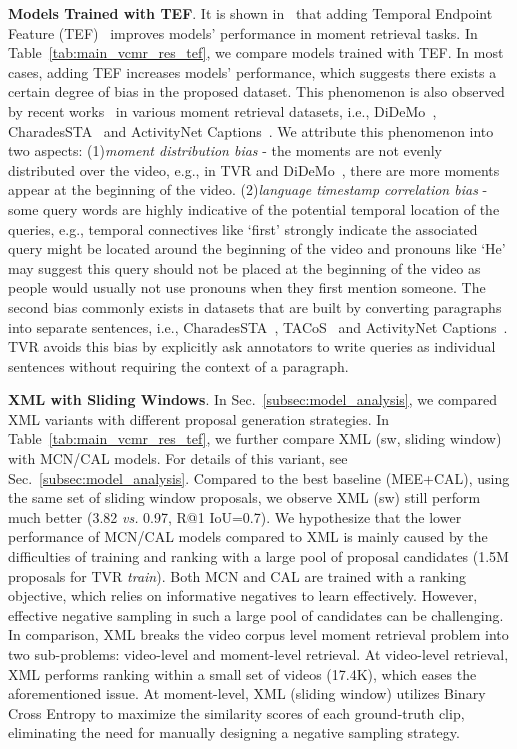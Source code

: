 \documentclass[runningheads]{llncs}
\begin{document}
\kern2mm
\noindent\textbf{Models Trained with TEF}. It is shown in~\cite{anne2017localizing,escorcia2019temporal} that adding Temporal Endpoint Feature (TEF)~\cite{anne2017localizing} improves models' performance in moment retrieval tasks. In Table~\ref{tab:main_vcmr_res_tef}, we compare models trained with TEF. 
In most cases, adding TEF increases models' performance, which suggests there exists a certain degree of bias in the proposed dataset. 
This phenomenon is also observed by recent works~\cite{anne2017localizing,escorcia2019temporal} in various moment retrieval datasets, i.e., DiDeMo~\cite{anne2017localizing}, CharadesSTA~\cite{gao2017tall} and ActivityNet Captions~\cite{Krishna2017DenseCaptioningEI}. 
We attribute this phenomenon into two aspects: (1)\textit{moment distribution bias} - the moments are not evenly distributed over the video, e.g., in TVR and DiDeMo~\cite{anne2017localizing}, there are more moments appear at the beginning of the video. (2)\textit{language timestamp correlation bias} - some query words are highly indicative of the potential temporal location of the queries, e.g., temporal connectives like `first' strongly indicate the associated query might be located around the beginning of the video and pronouns like `He' may suggest this query should not be placed at the beginning of the video as people would usually not use pronouns when they first mention someone. 
The second bias commonly exists in datasets that are built by converting paragraphs into separate sentences, i.e., CharadesSTA~\cite{gao2017tall}, TACoS~\cite{regneri2013grounding} and ActivityNet Captions~\cite{Krishna2017DenseCaptioningEI}. 
TVR avoids this bias by explicitly ask annotators to write queries as individual sentences without requiring the context of a paragraph. 


\kern2mm
\noindent\textbf{XML with Sliding Windows}.
In Sec.~\ref{subsec:model_analysis}, we compared XML variants with different proposal generation strategies. 
In Table~\ref{tab:main_vcmr_res_tef}, we further compare XML (sw, sliding window) with MCN/CAL models. For details of this variant, see Sec.~\ref{subsec:model_analysis}.
Compared to the best baseline (MEE+CAL), using the same set of sliding window proposals, we observe XML (sw) still perform much better (3.82 \textit{vs.} 0.97, R@1 IoU=0.7).
We hypothesize that the lower performance of MCN/CAL models compared to XML is mainly caused by the difficulties of training and ranking with a large pool of proposal candidates (1.5M proposals for TVR \textit{train}). Both MCN and CAL are trained with a ranking objective, which relies on informative negatives to learn effectively. However, effective negative sampling in such a large pool of candidates can be challenging. In comparison, XML breaks the video corpus level moment retrieval problem into two sub-problems: video-level and moment-level retrieval. At video-level retrieval, XML performs ranking within a small set of videos (17.4K), which eases the aforementioned issue. At moment-level, XML (sliding window) utilizes Binary Cross Entropy to maximize the similarity scores of each ground-truth clip, eliminating the need for manually designing a negative sampling strategy.
\end{document}
